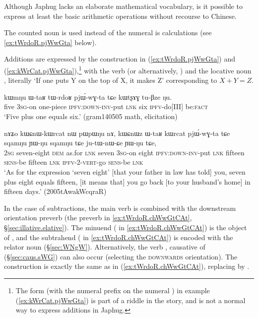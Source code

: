 Although Japhug lacks an elaborate mathematical vocabulary, is it possible to express at least the basic arithmetic operations without recourse to Chinese. 

The counted noun  is used instead of the numeral  is calculations (see \ref{ex:tWrdoR.pjWwGta} below).

Additions are expressed by the construction in (\ref{ex:tWrdoR.pjWwGta}) and (\ref{ex:kWrCat.pjWwGta}),\footnote{The form  (with the numeral prefix  on the numeral ) in example (\ref{ex:kWrCat.pjWwGta}) is part of a riddle in the story, and is not a normal way to express additions in Japhug. } with the verb  (or alternatively, ) and the locative noun , literally  `If one puts Y on the top of X, it makes Z' corresponding to $X+Y=Z$.  

\begin{exe}
\ex \label{ex:tWrdoR.pjWwGta}
\gll kɯmŋu ɯ-taʁ tɯ-rdoʁ pjɯ́-wɣ-ta tɕe kɯtʂɤɣ tu-βze ŋu.  \\
 five \textsc{3sg}-on one-piece \textsc{ipfv}:\textsc{down}-\textsc{inv}-put \textsc{lnk} six \textsc{ipfv}-do[III] be:\textsc{fact} \\
\glt `Five plus one equals six.' (gram140505 math, elicitation)
\end{exe}

 

\begin{exe}
\ex \label{ex:kWrCat.pjWwGta}
\gll  nɤʑo kɯɕnɯ-kɯrcat nɯ pɯpɯŋu nɤ, kɯɕnɯz ɯ-taʁ kɯrcat pjɯ́-wɣ-ta tɕe sqamŋu ɲɯ-ŋu sqamŋu tɕe ju-tɯ-nɯ-ɕe ɲɯ-ŋu tɕe, \\
 \textsc{2sg} seven-eight \textsc{dem} as.for \textsc{lnk} seven  \textsc{3sg}-on eight \textsc{ipfv}:\textsc{down}-\textsc{inv}-put \textsc{lnk}  fifteen   \textsc{sens}-be fifteen \textsc{lnk} \textsc{ipfv}-2-\textsc{vert}-go \textsc{sens}-be \textsc{lnk} \\
\glt `As for the expression `seven eight' [that your father in law has told] you, seven plus eight equals fifteen, [it means that] you go back [to your husband's home] in fifteen days.' (2005tAwakWcqraR)
\end{exe}
  
 
In the case of subtractions, the  main verb is   combined with the downstream orientation preverb  (the preverb  in \ref{ex:tWrdoR.chWwGtCAt}, §\ref{sec:illative.elative}).  The minuend ( in \ref{ex:tWrdoR.chWwGtCAt}) is the object of , and the subtrahend  ( in \ref{ex:tWrdoR.chWwGtCAt}) is encoded with the relator noun  (§\ref{sec:WNgW}). Alternatively, the verb , causative of  (§\ref{sec:caus.sWG}) can also occur (selecting the \textsc{downwards} orientation). The construction is exactly the same as in (\ref{ex:tWrdoR.chWwGtCAt}), replacing   by  .

